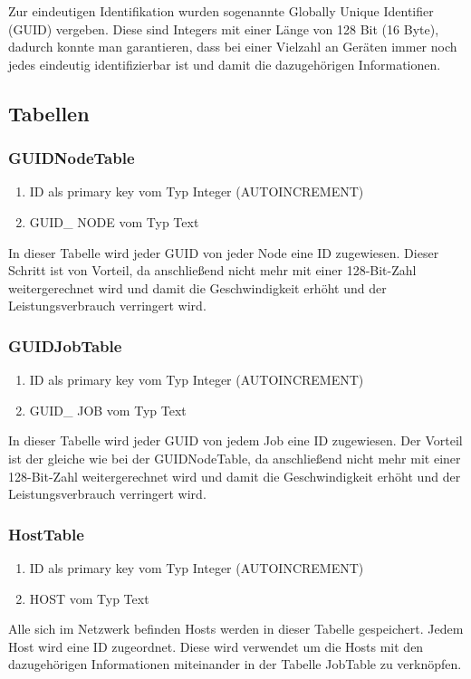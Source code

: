 \documentclass[12pt,a4paper]{report}
\begin{document}
\begin{onehalfspace}
Zur eindeutigen Identifikation wurden sogenannte Globally Unique Identifier (GUID) vergeben. Diese sind Integers mit einer Länge von 128 Bit (16 Byte), dadurch konnte man garantieren, dass bei einer Vielzahl an Geräten immer noch jedes eindeutig identifizierbar ist und damit die dazugehörigen Informationen.
\subsection{Tabellen}
\subsubsection{GUIDNodeTable}
\begin{enumerate}
\item ID als primary key vom Typ Integer (AUTOINCREMENT)
\item GUID\_ NODE vom Typ Text
\end{enumerate}
In dieser Tabelle wird jeder GUID von jeder Node eine ID zugewiesen. Dieser Schritt ist von Vorteil, da anschließend nicht mehr mit einer 128-Bit-Zahl weitergerechnet wird und damit die Geschwindigkeit erhöht und der Leistungsverbrauch verringert wird.
\subsubsection{GUIDJobTable}
\begin{enumerate}
\item ID als primary key vom Typ Integer (AUTOINCREMENT)
\item GUID\_ JOB vom Typ Text
\end{enumerate}
In dieser Tabelle wird jeder GUID von jedem Job eine ID zugewiesen. Der Vorteil ist der gleiche wie bei der GUIDNodeTable, da anschließend nicht mehr mit einer 128-Bit-Zahl weitergerechnet wird und damit die Geschwindigkeit erhöht und der Leistungsverbrauch verringert wird.
\subsubsection{HostTable}
\begin{enumerate}
\item ID als primary key vom Typ Integer (AUTOINCREMENT)
\item HOST vom Typ Text
\end{enumerate}
Alle sich im Netzwerk befinden Hosts werden in dieser Tabelle gespeichert. Jedem Host wird eine ID zugeordnet. Diese wird verwendet um die Hosts mit den dazugehörigen Informationen miteinander in der Tabelle JobTable zu verknöpfen.

\end{onehalfspace}
\end{document}
